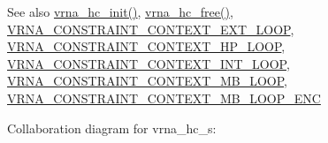 \begin{DoxySeeAlso}{See also}
\mbox{\hyperlink{group__hard__constraints_ga36ff456c43bf920629cee5a236e4f0ff}{vrna\+\_\+hc\+\_\+init()}}, \mbox{\hyperlink{group__hard__constraints_ga696dcf77887d856c6f21ea266d8b9ca2}{vrna\+\_\+hc\+\_\+free()}}, \mbox{\hyperlink{group__hard__constraints_ga9418eda62a5dec070896702c279d2548}{V\+R\+N\+A\+\_\+\+C\+O\+N\+S\+T\+R\+A\+I\+N\+T\+\_\+\+C\+O\+N\+T\+E\+X\+T\+\_\+\+E\+X\+T\+\_\+\+L\+O\+OP}}, \mbox{\hyperlink{group__hard__constraints_ga79203702b197b6b9d3b78eed40663eb1}{V\+R\+N\+A\+\_\+\+C\+O\+N\+S\+T\+R\+A\+I\+N\+T\+\_\+\+C\+O\+N\+T\+E\+X\+T\+\_\+\+H\+P\+\_\+\+L\+O\+OP}}, \mbox{\hyperlink{group__hard__constraints_ga21feeab3a9e5fa5a9e3d9ac0fcf5994f}{V\+R\+N\+A\+\_\+\+C\+O\+N\+S\+T\+R\+A\+I\+N\+T\+\_\+\+C\+O\+N\+T\+E\+X\+T\+\_\+\+I\+N\+T\+\_\+\+L\+O\+OP}}, \mbox{\hyperlink{group__hard__constraints_ga456ecd2ff00056bb64da8dd4f61bbfc5}{V\+R\+N\+A\+\_\+\+C\+O\+N\+S\+T\+R\+A\+I\+N\+T\+\_\+\+C\+O\+N\+T\+E\+X\+T\+\_\+\+M\+B\+\_\+\+L\+O\+OP}}, \mbox{\hyperlink{group__hard__constraints_ga02a3d703ddbcfce393e4bbfcb9db7077}{V\+R\+N\+A\+\_\+\+C\+O\+N\+S\+T\+R\+A\+I\+N\+T\+\_\+\+C\+O\+N\+T\+E\+X\+T\+\_\+\+M\+B\+\_\+\+L\+O\+O\+P\+\_\+\+E\+NC}} 
\end{DoxySeeAlso}


Collaboration diagram for vrna\+\_\+hc\+\_\+s\+:

